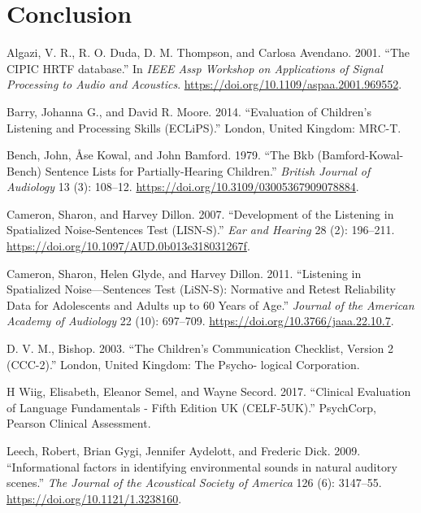\documentclass[a4paper,nobind]{templates/ociamthesis}
\begin{document}
\hypertarget{conclusion}{%
\section{Conclusion}\label{conclusion}}

\clearpage

\hypertarget{refs}{}
\begin{cslreferences}
\leavevmode\hypertarget{ref-Algazi2001}{}%
Algazi, V. R., R. O. Duda, D. M. Thompson, and Carlosa Avendano. 2001. ``The CIPIC HRTF database.'' In \emph{IEEE Assp Workshop on Applications of Signal Processing to Audio and Acoustics}. \url{https://doi.org/10.1109/aspaa.2001.969552}.

\leavevmode\hypertarget{ref-Barry2014}{}%
Barry, Johanna G., and David R. Moore. 2014. ``Evaluation of Children's Listening and Processing Skills (ECLiPS).'' London, United Kingdom: MRC-T.

\leavevmode\hypertarget{ref-Bench1979}{}%
Bench, John, Åse Kowal, and John Bamford. 1979. ``The Bkb (Bamford-Kowal-Bench) Sentence Lists for Partially-Hearing Children.'' \emph{British Journal of Audiology} 13 (3): 108--12. \url{https://doi.org/10.3109/03005367909078884}.

\leavevmode\hypertarget{ref-Cameron2007}{}%
Cameron, Sharon, and Harvey Dillon. 2007. ``Development of the Listening in Spatialized Noise-Sentences Test (LISN-S).'' \emph{Ear and Hearing} 28 (2): 196--211. \url{https://doi.org/10.1097/AUD.0b013e318031267f}.

\leavevmode\hypertarget{ref-Cameron2011}{}%
Cameron, Sharon, Helen Glyde, and Harvey Dillon. 2011. ``Listening in Spatialized Noise---Sentences Test (LiSN-S): Normative and Retest Reliability Data for Adolescents and Adults up to 60 Years of Age.'' \emph{Journal of the American Academy of Audiology} 22 (10): 697--709. \url{https://doi.org/10.3766/jaaa.22.10.7}.

\leavevmode\hypertarget{ref-D.V.M.2003}{}%
D. V. M., Bishop. 2003. ``The Children's Communication Checklist, Version 2 (CCC-2).'' London, United Kingdom: The Psycho- logical Corporation.

\leavevmode\hypertarget{ref-HWiig2017}{}%
H Wiig, Elisabeth, Eleanor Semel, and Wayne Secord. 2017. ``Clinical Evaluation of Language Fundamentals - Fifth Edition UK (CELF-5UK).'' PsychCorp, Pearson Clinical Assessment.

\leavevmode\hypertarget{ref-Leech2009}{}%
Leech, Robert, Brian Gygi, Jennifer Aydelott, and Frederic Dick. 2009. ``Informational factors in identifying environmental sounds in natural auditory scenes.'' \emph{The Journal of the Acoustical Society of America} 126 (6): 3147--55. \url{https://doi.org/10.1121/1.3238160}.


\end{cslreferences}
\end{document}
